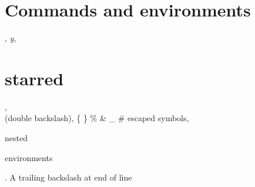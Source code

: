 \documentclass{article}
\begin{document}
\section{Commands and environments}
\newcommand{\vect}[1]{\mathbf{#1}} \renewcommand*{\emph}[1]{\textit{#1}}
\vect{x}, \emph{y}, \section*{starred}, \\ (double backslash), \{ \} \% \& \_ \# escaped symbols,
\begin{center}nested \begin{small}environments\end{small}\end{center}.
A trailing backslash at end of line \\
\end{document}
